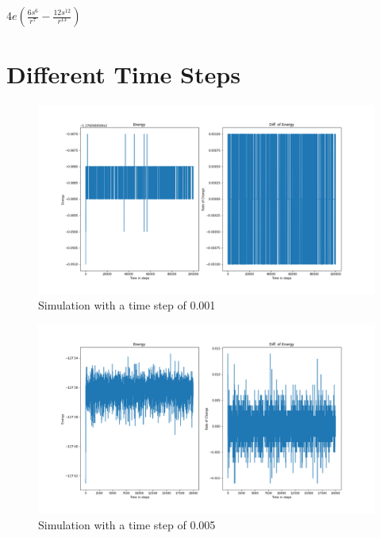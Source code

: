     $\displaystyle 4 e \left(\frac{6 s^{6}}{r^{7}} - \frac{12 s^{12}}{r^{13}}\right)$




\section{Different Time Steps}

\begin{figure}[!h]
	\begin{center}
		\includegraphics[scale=1]{Figure/plot_001.png}
	\end{center}
	\caption[Simulation]{Simulation with a time step of 0.001}
	\label{Plot001}
\end{figure}
\begin{figure}[!h]
	\begin{center}
		\includegraphics[scale= 1]{Figure/plot_005.png}
	\end{center}
	\caption[Simulation]{Simulation with a time step of 0.005}
	\label{Plot005}
\end{figure}
